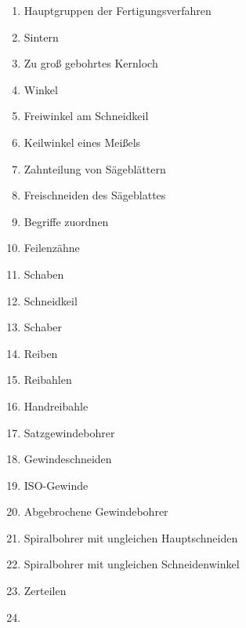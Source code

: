 \begin{enumerate}
\item
  Hauptgruppen der Fertigungsverfahren\\
\item
  Sintern\\
\item
  Zu groß gebohrtes Kernloch\\
\item
  Winkel\\
\item
  Freiwinkel am Schneidkeil\\
\item
  Keilwinkel eines Meißels\\
\item
  Zahnteilung von Sägeblättern\\
\item
  Freischneiden des Sägeblattes\\
\item
  Begriffe zuordnen\\
\item
  Feilenzähne\\
\item
  Schaben\\
\item
  Schneidkeil\\
\item
  Schaber\\
\item
  Reiben\\
\item
  Reibahlen\\
\item
  Handreibahle\\
\item
  Satzgewindebohrer\\
\item
  Gewindeschneiden\\
\item
  ISO-Gewinde\\
\item
  Abgebrochene Gewindebohrer\\
\item
  Spiralbohrer mit ungleichen Hauptschneiden\\
\item
  Spiralbohrer mit ungleichen Schneidenwinkel\\
\item
  Zerteilen\\
\item

\end{enumerate}
